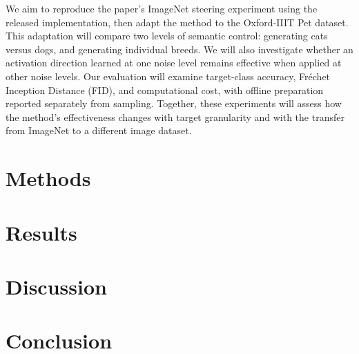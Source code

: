 \documentclass[12pt,letterpaper]{article}
\begin{document}
We aim to reproduce the paper's ImageNet steering experiment using the released implementation, then adapt the method to the Oxford-IIIT Pet dataset.
This adaptation will compare two levels of semantic control: generating cats versus dogs, and generating individual breeds.
We will also investigate whether an activation direction learned at one noise level remains effective when applied at other noise levels.
Our evaluation will examine target-class accuracy, Fr\'echet Inception Distance (FID), and computational cost, with offline preparation reported separately from sampling.
Together, these experiments will assess how the method's effectiveness changes with target granularity and with the transfer from ImageNet to a different image dataset.

\section{Methods}



\section{Results}



\section{Discussion}



\section{Conclusion}




\makereference



\end{document}
